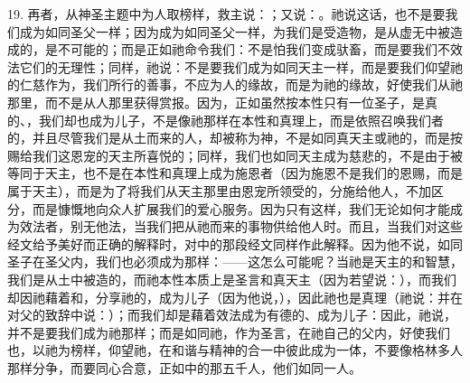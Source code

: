 19. 再者，从神圣主题中为人取榜样，救主说：；又说：。祂说这话，也不是要我们成为如同圣父一样；因为成为如同圣父一样，为我们是受造物，是从虚无中被造成的，是不可能的；而是正如祂命令我们：不是怕我们变成驮畜，而是要我们不效法它们的无理性；同样，祂说：不是要我们成为如同天主一样，而是要我们仰望祂的仁慈作为，我们所行的善事，不应为人的缘故，而是为祂的缘故，好使我们从祂那里，而不是从人那里获得赏报。因为，正如虽然按本性只有一位圣子，是真的、，我们却也成为儿子，不是像祂那样在本性和真理上，而是依照召唤我们者的，并且尽管我们是从土而来的人，却被称为神，不是如同真天主或祂的，而是按赐给我们这恩宠的天主所喜悦的；同样，我们也如同天主成为慈悲的，不是由于被等同于天主，也不是在本性和真理上成为施恩者（因为施恩不是我们的恩赐，而是属于天主），而是为了将我们从天主那里由恩宠所领受的，分施给他人，不加区分，而是慷慨地向众人扩展我们的爱心服务。因为只有这样，我们无论如何才能成为效法者，别无他法，当我们把从祂而来的事物供给他人时。而且，当我们对这些经文给予美好而正确的解释时，对中的那段经文同样作此解释。因为他不说，如同圣子在圣父内，我们也必须成为那样：——这怎么可能呢？当祂是天主的和智慧，我们是从土中被造的，而祂本性本质上是圣言和真天主（因为若望说：），而我们却因祂藉着和，分享祂的，成为儿子（因为他说，），因此祂也是真理（祂说：并在对父的致辞中说：）；而我们却是藉着效法成为有德的、成为儿子：因此，祂说，并不是要我们成为祂那样；而是如同祂，作为圣言，在祂自己的父内，好使我们也，以祂为榜样，仰望祂，在和谐与精神的合一中彼此成为一体，不要像格林多人那样分争，而要同心合意，正如中的那五千人，他们如同一人。\par

